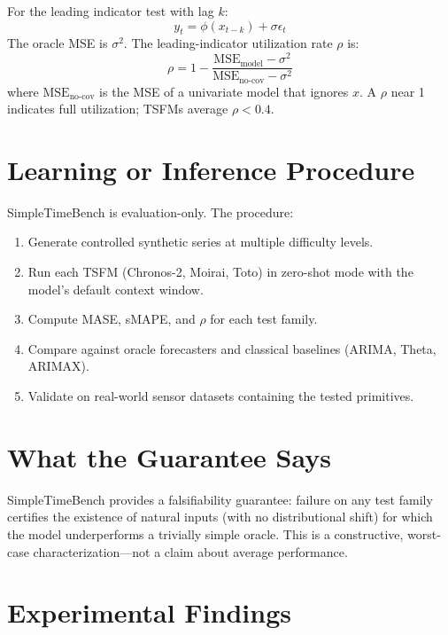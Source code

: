 \documentclass[10pt,twocolumn]{article}
\begin{document}
For the leading indicator test with lag $k$:
\[
y_t = \phi(x_{t-k}) + \sigma\epsilon_t
\]
The oracle MSE is $\sigma^2$. The leading-indicator utilization rate $\rho$ is:
\[
\rho = 1 - \frac{\text{MSE}_{\text{model}} - \sigma^2}{\text{MSE}_{\text{no-cov}} - \sigma^2}
\]
where $\text{MSE}_{\text{no-cov}}$ is the MSE of a univariate model that ignores $x$.
A $\rho$ near 1 indicates full utilization; TSFMs average $\rho < 0.4$.

\section{Learning or Inference Procedure}

SimpleTimeBench is evaluation-only. The procedure:
\begin{enumerate}[itemsep=2pt,parsep=0pt]
  \item Generate controlled synthetic series at multiple difficulty levels.
  \item Run each TSFM (Chronos-2, Moirai, Toto) in zero-shot mode with
    the model's default context window.
  \item Compute MASE, sMAPE, and $\rho$ for each test family.
  \item Compare against oracle forecasters and classical baselines
    (ARIMA, Theta, ARIMAX).
  \item Validate on real-world sensor datasets containing the tested primitives.
\end{enumerate}

\section{What the Guarantee Says}

SimpleTimeBench provides a falsifiability guarantee: failure on any test family certifies
the existence of natural inputs (with no distributional shift) for which the model
underperforms a trivially simple oracle. This is a constructive, worst-case
characterization---not a claim about average performance.

\section{Experimental Findings}
\end{document}
